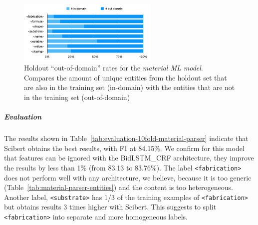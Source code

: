 \documentclass[]{interact}
\theoremstyle{plain}%
\theoremstyle{definition}
\theoremstyle{remark}
\begin{document}
\begin{figure}[ht]
    \centering
    \includegraphics[width=0.6\textwidth]{material-out-domain-holdout-unique}
    \caption{Holdout ``out-of-domain'' rates for the \textit{material ML model}. Compares the amount of unique entities from the holdout set that are also in the training set (in-domain) with the entities that are not in the training set (out-of-domain)}
    \label{fig:material-out-domain-holdout}
\end{figure}

\subparagraph*{Evaluation}

The results shown in Table~\ref{tab:evaluation-10fold-material-parser} indicate that Scibert obtains the best results, with F1 at 84.15\%.
We confirm for this model that features can be ignored with the BidLSTM\_CRF architecture, they improve the results by less than 1\% (from 83.13 to 83.76\%).
The label \texttt{<fabrication>} does not perform well with any architecture, we believe, because it is too generic (Table~\ref{tab:material-parser-entities}) and the content is too heterogeneous. Another label, \texttt{<substrate>} has 1/3 of the training examples of \texttt{<fabrication>} but obtains results 3 times higher with Scibert.
This suggests to split \texttt{<fabrication>} into separate and more homogeneous labels.
\end{document}
